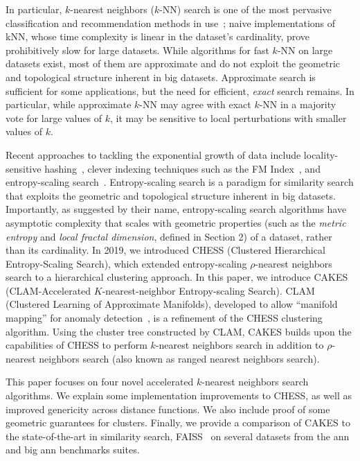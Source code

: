 In particular, $k$-nearest neighbors ($k$-NN) search is one of the most pervasive classification and recommendation methods in use~\cite{fix1952discriminatory, cover1967nearest}; 
naive implementations of kNN, whose time complexity is linear in the dataset's cardinality, 
prove prohibitively slow for large datasets. While algorithms for fast $k$-NN on large datasets exist, most of them are approximate and do not 
exploit the geometric and topological structure inherent in big datasets. Approximate search is sufficient for some applications, but the 
need for efficient, \emph{exact} search remains.
In particular, while approximate $k$-NN may agree with exact $k$-NN in a majority vote for large values of $k$, it may be sensitive to local perturbations with smaller values of $k$.

Recent approaches to tackling the exponential growth of data include locality-sensitive hashing~\cite{indyk1999sublinear}, 
clever indexing techniques such as the FM Index~\cite{simpson2010efficient}, and entropy-scaling search~\cite{yu2015entropy, ishaq2019clustered}. 
Entropy-scaling search is a paradigm for similarity search that exploits the geometric and topological structure inherent in big datasets.
Importantly, as suggested by their name, entropy-scaling search algorithms have asymptotic complexity that scales with geometric properties (such as the 
\emph{metric entropy} and \emph{local fractal dimension}, defined in Section 2) of a dataset,
rather than its cardinality. In 2019, we introduced CHESS (Clustered Hierarchical Entropy-Scaling Search), which extended entropy-scaling $\rho$-nearest 
neighbors search to a hierarchical clustering approach. In this paper, we introduce CAKES (CLAM-Accelerated $K$-nearest-neighbor 
Entropy-scaling Search). CLAM (Clustered Learning of Approximate Manifolds), developed to allow ``manifold mapping'' for anomaly detection~\cite{ishaq2021clustered}, is a refinement of the CHESS clustering algorithm. 
Using the cluster tree constructed by CLAM, CAKES builds upon the capabilities of CHESS to perform 
$k$-nearest neighbors search in addition to $\rho$-nearest neighbors search (also known as ranged nearest neighbors search).


This paper focuses on four novel accelerated $k$-nearest neighbors search algorithms. We explain some 
implementation improvements to CHESS, as well as improved genericity across distance functions. 
We also include proof of some geometric guarantees for clusters. Finally, we provide a comparison of 
CAKES to the state-of-the-art in similarity search, FAISS~\cite{johnson2019billion} on several datasets 
from the ann and big ann benchmarks suites. 